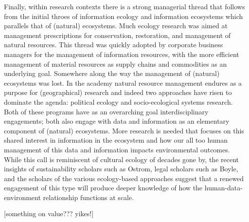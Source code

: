 Finally, within research contexts there is a strong managerial thread that follows from the initial throes of information ecology and information ecosystems which parallels that of (natural) ecosystems. Much ecology research was aimed at management prescriptions for conservation, restoration, and management of natural resources. This thread was quickly adopted by corporate business managers for the management of information resources, with the more efficient management of material resources as supply chains and commodities as an underlying goal. Somewhere along the way the management of (natural) ecosystems was lost. In the academy natural resource management endures as a purpose for (geographical) research and indeed two approaches have risen to dominate the agenda: political ecology and socio-ecological systems research. Both of these programs have as an overarching goal interdisciplinary engagements; both also engage with data and information as an elementary component of (natural) ecosystems. More research is needed that focuses on this shared interest in information in the ecosystem and how our all too human management of this data and information impacts environmental outcomes. While this call is reminiscent of cultural ecology of decades gone by, the recent insights of sustainability scholars such as Ostrom, legal scholars such as Boyle, and the scholars of the various ecology-based approaches suggest that a renewed engagement of this type will produce deeper knowledge of how the human-data-environment relationship functions at scale.

[something on value??? yikes!]